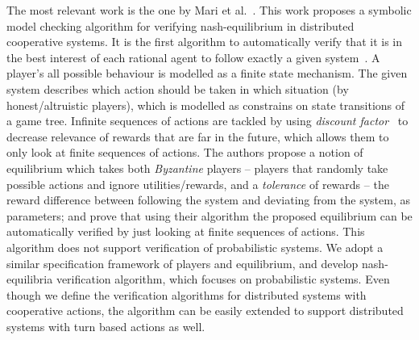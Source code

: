 
%

The most relevant work is the one by Mari et al.~\cite{MMS08}. This work proposes a symbolic model checking algorithm for verifying nash-equilibrium in distributed cooperative systems. It is the first algorithm to automatically verify that it is in the best interest of each rational agent to follow exactly a given system~\cite{MMS08}. A player's all possible behaviour is modelled as a finite state mechanism. The given system describes which action should be taken in which situation (by honest/altruistic players), which is modelled as constrains on state transitions of a game tree. Infinite sequences of actions are tackled by using \emph{discount factor}~\cite{FT91} to decrease relevance of rewards that are far in the future, which allows them to only look at finite sequences of actions. The authors propose a notion of equilibrium which takes both \emph{Byzantine} players -- players that randomly take possible actions and ignore utilities/rewards, and a \emph{tolerance} of rewards -- the reward difference between following the system and deviating from the system, as parameters; and prove that using their algorithm the proposed equilibrium can be automatically verified by just looking at finite sequences of actions. This algorithm does not support verification of probabilistic systems. We adopt a similar specification framework of players and equilibrium, and develop nash-equilibria verification algorithm, which focuses on probabilistic systems. Even though we define the verification algorithms for distributed systems with cooperative actions, the algorithm can be easily extended to support distributed systems with turn based actions as well.

